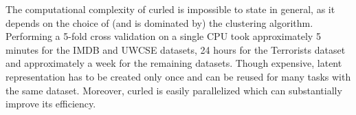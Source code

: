 The computational complexity of \gls{curled} is impossible to state in general, as it depends on the choice of (and is dominated by) the clustering algorithm.
Performing a 5-fold cross validation on a single CPU took approximately 5 minutes for the IMDB and UWCSE datasets, 24 hours for the Terrorists dataset and approximately a week for the remaining datasets.
Though expensive, latent representation has to be created only once and can be reused for many tasks with the same dataset.
Moreover, \gls{curled} is easily parallelized which can substantially improve its efficiency.


\begin{table}[t]
\captionsetup{justification=centerlast}
\begin{center}
\footnotesize
\caption{Vocabulary sizes. M indicates MRC, while S and H indicate \gls{curled} representations with spectral and hierarchical clustering, respectively. Vocabulary sizes obtained with \textit{merging} and \textit{combination} similarities were similar, so only the one for merging is reported. }
\end{center}
\end{table}
